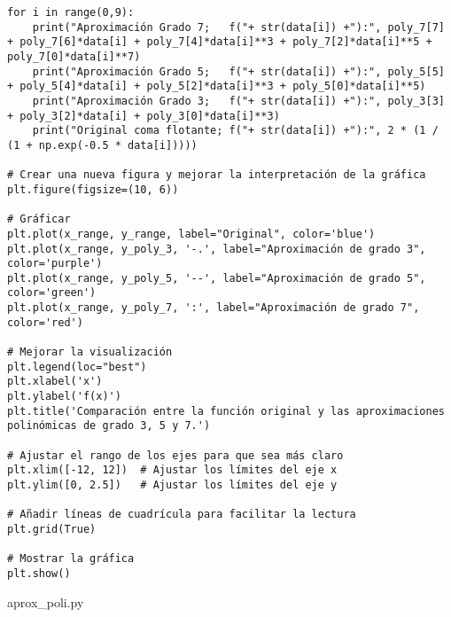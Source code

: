 \begin{code}
\begin{verbatim}
for i in range(0,9):
    print("Aproximación Grado 7;   f("+ str(data[i]) +"):", poly_7[7] + poly_7[6]*data[i] + poly_7[4]*data[i]**3 + poly_7[2]*data[i]**5 + poly_7[0]*data[i]**7)
    print("Aproximación Grado 5;   f("+ str(data[i]) +"):", poly_5[5] + poly_5[4]*data[i] + poly_5[2]*data[i]**3 + poly_5[0]*data[i]**5)
    print("Aproximación Grado 3;   f("+ str(data[i]) +"):", poly_3[3] + poly_3[2]*data[i] + poly_3[0]*data[i]**3)
    print("Original coma flotante; f("+ str(data[i]) +"):", 2 * (1 / (1 + np.exp(-0.5 * data[i]))))

# Crear una nueva figura y mejorar la interpretación de la gráfica
plt.figure(figsize=(10, 6))

# Gráficar
plt.plot(x_range, y_range, label="Original", color='blue')
plt.plot(x_range, y_poly_3, '-.', label="Aproximación de grado 3", color='purple')
plt.plot(x_range, y_poly_5, '--', label="Aproximación de grado 5", color='green')
plt.plot(x_range, y_poly_7, ':', label="Aproximación de grado 7", color='red')

# Mejorar la visualización
plt.legend(loc="best")
plt.xlabel('x')
plt.ylabel('f(x)')
plt.title('Comparación entre la función original y las aproximaciones polinómicas de grado 3, 5 y 7.')

# Ajustar el rango de los ejes para que sea más claro
plt.xlim([-12, 12])  # Ajustar los límites del eje x
plt.ylim([0, 2.5])   # Ajustar los límites del eje y

# Añadir líneas de cuadrícula para facilitar la lectura
plt.grid(True)

# Mostrar la gráfica
plt.show()
\end{verbatim}
\caption{aprox\_poli.py}
\label{ap-cod:26}
\end{code}

